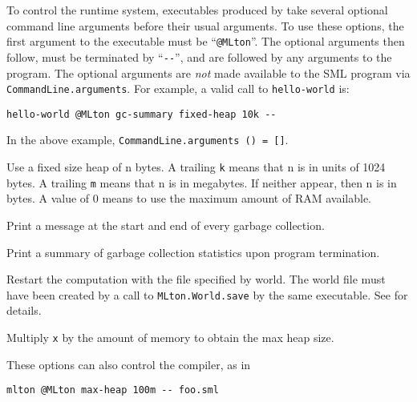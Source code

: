 
To control the runtime system, executables produced by {\mlton} take
several optional command line arguments before their usual arguments.
To use these options, the first argument to the executable must be
``\verb+@MLton+''.  The optional arguments then follow, must be
terminated by ``\verb+--+'', and are followed by any arguments to the program.
The optional arguments are {\em not} made available to the SML
program via {\tt CommandLine.arguments}.  For example, a valid call
to {\tt hello-world} is: 
\begin{verbatim}
hello-world @MLton gc-summary fixed-heap 10k --
\end{verbatim}
In the above example, {\tt CommandLine.arguments () = []}.

\begin{description}
 Use a fixed size heap of n bytes.
 A trailing {\tt k} means that n is in units of 1024 bytes. 
 A trailing {\tt m} means that n is in megabytes. 
 If neither appear, then n is in bytes.
 A value of 0 means to use the maximum amount of RAM available.

Print a message at the start and end of every garbage collection.

Print a summary of garbage collection statistics upon program
termination.

Restart the computation with the file specified by world.
The world file must have been created by a call to
{\tt MLton.World.save} by the same executable.  See 
for details.


Multiply {\tt x} by the amount of memory to obtain the max heap size.
\end{description}
These options can also control the compiler, as in
\begin{verbatim}
mlton @MLton max-heap 100m -- foo.sml
\end{verbatim}
